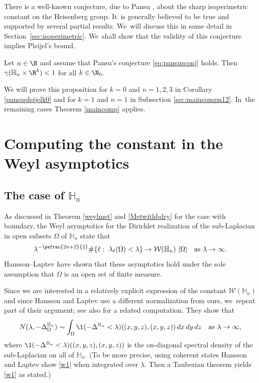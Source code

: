 There is a well-known conjecture, due to Pansu \cite{Pa2}, about the sharp isoperimetric constant on the Heisenberg group. It~is generally believed to be true and supported by several partial results. We~will discuss this in some detail in Section~\ref{sec:isoperimetric}. We~shall show that the validity of this conjecture implies Pleijel's bound.

\begin{proposition}\label{pansupleijel}
Let $n\in\N$ and assume that Pansu's conjecture \eqref{eq:pansusconj} holds. Then $\gamma(\mathbb H_n\times\R^k)<1$ for all $k\in\N_0$.
\end{proposition}

We will prove this proposition for $k=0$ and $n=1,2,3$ in Corollary \ref{pansupleijelk0} and for $k=1$ and $n=1$ in Subsection \ref{sec:maincompn12}. In~the remaining cases Theorem \ref{maincomp} applies.

\section{Computing the constant in the Weyl asymptotics}\label{sec:weylhnrk}

\subsection{The case of $\mathbb H_n$}\label{sec:weylheis1}
As discussed in Theorem \ref{weylmet} and \eqref{Metwithbdry} for the case with boundary, the Weyl asymptotics for the Dirichlet realization of the sub-Laplacian in open subsets $\Omega$ of $\mathbb H_n$ state that
\[
\lambda^{-\psfrac{2n+2}{2}} \#\{ \ell:\ \lambda_\ell(\Omega)<\lambda \} \to \mathcal W(\mathbb H_n) \ |\Omega|
\quad\text{as}\ \lambda\to\infty.
\]
Hansson--Laptev \cite{HL} have shown that these asymptotics hold under the sole assumption that $\Omega$ is an open set of finite measure.

Since we are interested in a relatively explicit expression of the constant $\mathcal W(\mathbb H_n)$ and since Hansson and Laptev use a different normalization from ours, we~repeat part of their argument; see also \cite{St} for a related computation. They show that
\begin{equation}\label{w1}
N(\lambda,-\Delta_\Omega^{\mathbb H_n}) \sim \int_\Omega \1(-\Delta^{\mathbb H_n} <\lambda)((x,y,z),(x,y,z)) \,dx\,dy\,dz
\quad\text{as}\ \lambda\to\infty,
\end{equation}
where $\1(-\Delta^{\mathbb H_n} <\lambda)((x,y,z),(x,y,z))$ is the on-diagonal spectral density of the sub-Laplacian on all of $\mathbb H_n$. (To be more precise, using coherent states Hansson and Laptev show \eqref{w1} when integrated over $\lambda$. Then a Tauberian theorem yields \eqref{w1} as stated.)

